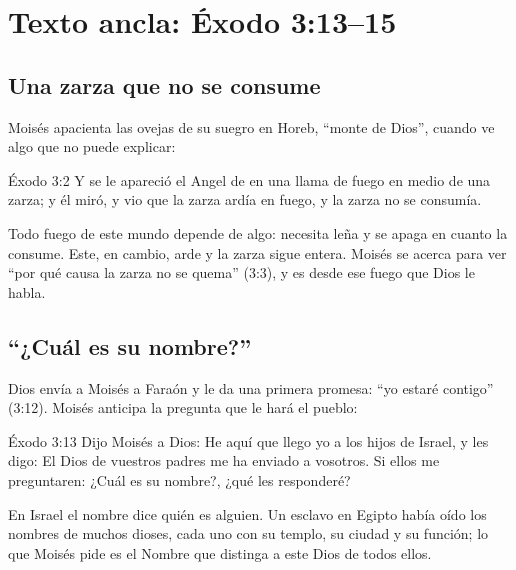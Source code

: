 \section{Texto ancla: Éxodo 3:13--15}

\subsection{Una zarza que no se consume}
Moisés apacienta las ovejas de su suegro en Horeb, ``monte de Dios'', cuando ve algo que no puede explicar:

\begin{verso}{Éxodo 3:2}
Y se le apareció el Angel de \SENOR{} en una llama de fuego en medio de una zarza; y él miró, y vio que la zarza ardía en fuego, y la zarza no se consumía.
\end{verso}

Todo fuego de este mundo depende de algo: necesita leña y se apaga en cuanto la consume. Este, en cambio, arde y la zarza sigue entera. Moisés se acerca para ver ``por qué causa la zarza no se quema'' (3:3), y es desde ese fuego que Dios le habla.


\subsection{“¿Cuál es su nombre?”}
Dios envía a Moisés a Faraón y le da una primera promesa: ``yo estaré contigo'' (3:12). Moisés anticipa la pregunta que le hará el pueblo:

\begin{verso}{Éxodo 3:13}
Dijo Moisés a Dios: He aquí que llego yo a los hijos de Israel, y les digo: El Dios de vuestros padres me ha enviado a vosotros. Si ellos me preguntaren: ¿Cuál es su nombre?, ¿qué les responderé?
\end{verso}

En Israel el nombre dice quién es alguien. Un esclavo en Egipto había oído los nombres de muchos dioses, cada uno con su templo, su ciudad y su función; lo que Moisés pide es el Nombre que distinga a este Dios de todos ellos.

